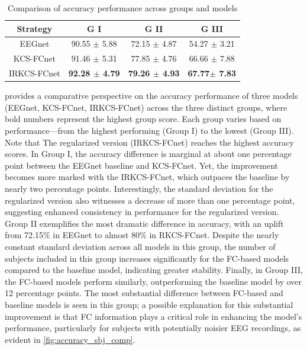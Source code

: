 \begin{table}
    \centering
    \caption{Comparison of accuracy performance across groups and models}
    \label{tab:acc_obj3}    
    \begin{tabular}{|c|c|c|c|}
        \hline
        Strategy & G I & G II  & G III \\
        \hline
        EEGnet & 90.55 $\pm$ 5.88 & 72.15 $\pm$ 4.87 & 54.27 $\pm$ 3.21 \\
        KCS-FCnet & 91.46 $\pm$ 5.31   &  77.85 $\pm$ 4.76 & 66.66 $\pm$ 7.88 \\
        IRKCS-FCnet & \textbf{92.28 $\pm$ 4.79}  & \textbf{79.26 $\pm$ 4.93}  & \textbf{67.77$\pm$ 7.83} \\
        \hline
    \end{tabular}
\end{table}

 provides a comparative perspective on the accuracy performance of three models (EEGnet, KCS-FCnet, IRKCS-FCnet)  across the three distinct groups, where bold numbers represent the highest group score. Each group varies based on performance—from the highest performing (Group I) to the lowest (Group III). Note that The regularized version (IRKCS-FCnet) reaches the highest accuracy scores. In Group I, the accuracy difference is marginal at about one percentage point between the EEGnet baseline and KCS-FCnet. Yet, the improvement becomes more marked with the IRKCS-FCnet, which outpaces the baseline by nearly two percentage points. Interestingly, the standard deviation for the regularized version also witnesses a decrease of more than one percentage point, suggesting enhanced consistency in performance for the regularized version. Group II exemplifies the most dramatic difference in accuracy, with an uplift from 72.15\% in EEGnet to almost 80\% in RKCS-FCnet. Despite the nearly constant standard deviation across all models in this group, the number of subjects included in this group increases significantly for the FC-based models compared to the baseline model, indicating greater stability. Finally, in Group III, the FC-based models perform similarly, outperforming the baseline model by over 12 percentage points. The most substantial difference between FC-based and baseline models is seen in this group; a possible explanation for this substantial improvement is that FC information plays a critical role in enhancing the model's performance, particularly for subjects with potentially noisier EEG recordings, as evident in \cref{fig:accuracy_sbj_comp}.


